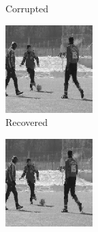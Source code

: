 \begin{figure}
\begin{subfigure}{0.4\textwidth}
    \caption{Corrupted}
  \end{subfigure}
  \begin{subfigure}{0.4\textwidth}
    \centering
    \includegraphics[width=.9\textwidth]{Chapter7/Images/soccer70_rec_11.png}
    \caption{Recovered}
  \end{subfigure}
  \begin{subfigure}{0.4\textwidth}
    \centering
    \includegraphics[width=.9\textwidth]{Chapter7/Images/soccer70_rec_12.png}

\end{subfigure}
\end{figure}
